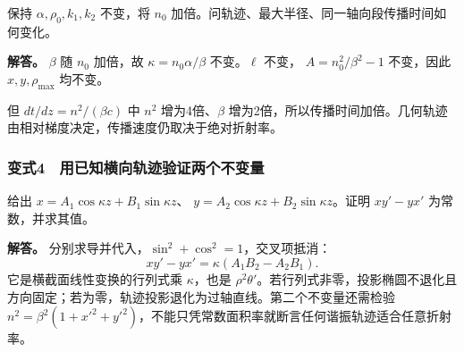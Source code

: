 \documentclass[12pt,a4paper,fontset=fandol]{ctexart}
\begin{document}
保持 \(\alpha,\rho_0,k_1,k_2\) 不变，将 \(n_0\)
加倍。问轨迹、最大半径、同一轴向段传播时间如何变化。

\textbf{解答。} \(\beta\) 随 \(n_0\) 加倍，故 \(\kappa=n_0\alpha/\beta\)
不变。\(\ell\) 不变， \(A=n_0^2/\beta^2-1\) 不变，因此
\(x,y,\rho_{\max}\) 均不变。

但 \(dt/dz=n^2/(\beta c)\) 中 \(n^2\) 增为4倍、\(\beta\)
增为2倍，所以传播时间加倍。几何轨迹由相对梯度决定，传播速度仍取决于绝对折射率。

\subsubsection{变式4　用已知横向轨迹验证两个不变量}\label{ux53d8ux5f0f4-ux7528ux5df2ux77e5ux6a2aux5411ux8f68ux8ff9ux9a8cux8bc1ux4e24ux4e2aux4e0dux53d8ux91cf}

给出 \(x=A_1\cos\kappa z+B_1\sin\kappa z\)、
\(y=A_2\cos\kappa z+B_2\sin\kappa z\)。证明 \(xy'-yx'\)
为常数，并求其值。

\textbf{解答。} 分别求导并代入，\(\sin^2+\cos^2=1\)，交叉项抵消： \[
\boxed{xy'-yx'=\kappa(A_1B_2-A_2B_1).}
\] 它是横截面线性变换的行列式乘 \(\kappa\)，也是
\(\rho^2\theta'\)。若行列式非零，投影椭圆不退化且方向固定；若为零，轨迹投影退化为过轴直线。第二个不变量还需检验
\(n^2=\beta^2(1+x'^2+y'^2)\)，不能只凭常数面积率就断言任何谐振轨迹适合任意折射率。
\end{document}
